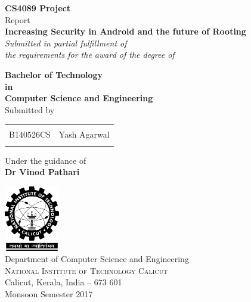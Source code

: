 \begin{titlepage}

\begin{center}

\textup{\small {\bf CS4089 Project} \\ Report}\\[0.2in]

\Large \textbf {Increasing Security in Android and the future of Rooting}\\[0.5in]

       \small \emph{Submitted in partial fulfillment of\\
        the requirements for the award of the degree of}
        \vspace{.2in}

       {\bf Bachelor of Technology \\in\\ Computer Science and Engineering}\\[0.5in]

\normalsize Submitted by \\
\begin{table}[h]
\centering
\begin{tabular}{lr}\\ \hline
\\
B140526CS & Yash Agarwal \\ \\ \hline 
\end{tabular}
\end{table}

\vspace{.1in}
Under the guidance of\\
{\textbf{Dr Vinod Pathari}}\\[0.2in]

\vfill

\includegraphics[width=0.18\textwidth]{./nitc-logo}\\[0.1in]
\Large{Department of Computer Science and Engineering}\\
\normalsize
\textsc{National Institute of Technology Calicut}\\
Calicut, Kerala, India -- 673 601 \\
\vspace{0.2cm}
Monsoon Semester 2017

\end{center}

\end{titlepage}
